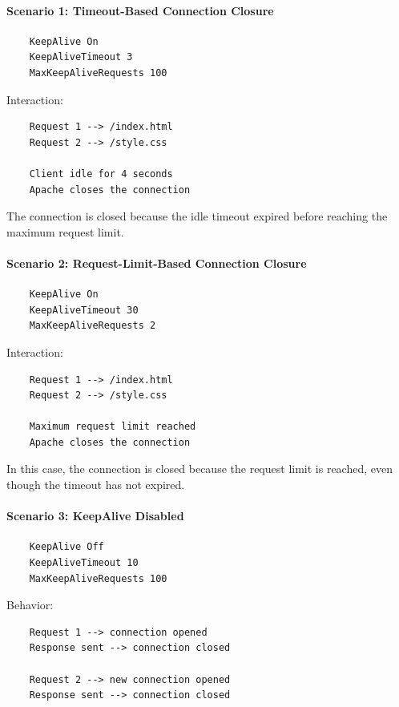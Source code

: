 \documentclass{scrbook}
\begin{document}
	\paragraph{Scenario 1: Timeout-Based Connection Closure}
	
	\begin{lstlisting}
	KeepAlive On
	KeepAliveTimeout 3
	MaxKeepAliveRequests 100
	\end{lstlisting}
	
	Interaction:
	
	\begin{lstlisting}
	Request 1 --> /index.html
	Request 2 --> /style.css
		
	Client idle for 4 seconds
	Apache closes the connection
	\end{lstlisting}
	
	The connection is closed because the idle timeout expired before reaching the maximum request limit.
	
	\paragraph{Scenario 2: Request-Limit-Based Connection Closure}
	
	\begin{lstlisting}
	KeepAlive On
	KeepAliveTimeout 30
	MaxKeepAliveRequests 2
	\end{lstlisting}
	
	Interaction:
	\begin{lstlisting}
	Request 1 --> /index.html
	Request 2 --> /style.css
		
	Maximum request limit reached	
	Apache closes the connection
	\end{lstlisting}
	
	In this case, the connection is closed because the request limit is reached, even though the timeout has not expired.
	
	\paragraph{Scenario 3: KeepAlive Disabled}
	
	\begin{lstlisting}
	KeepAlive Off
	KeepAliveTimeout 10
	MaxKeepAliveRequests 100
	\end{lstlisting}
	
	Behavior:
	\begin{lstlisting}
	Request 1 --> connection opened
	Response sent --> connection closed
		
	Request 2 --> new connection opened
	Response sent --> connection closed
	\end{lstlisting}
	
\end{document}
